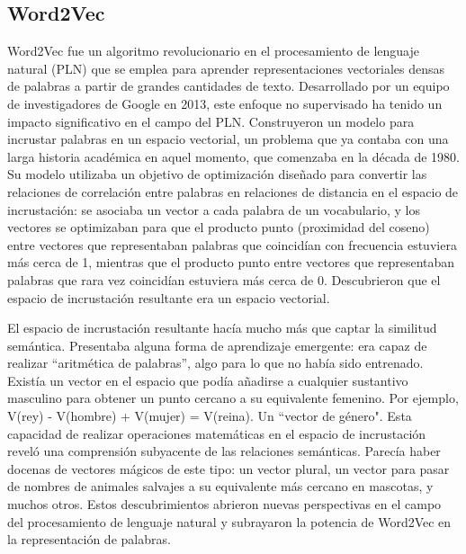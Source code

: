\subsection{Word2Vec}

Word2Vec fue un algoritmo revolucionario en el procesamiento de lenguaje natural (PLN) que se emplea para aprender representaciones vectoriales densas de palabras a partir de grandes cantidades de texto. Desarrollado por un equipo de investigadores de Google en 2013\cite{Mikolov2013Word2Vec}, este enfoque no supervisado ha tenido un impacto significativo en el campo del PLN. Construyeron un modelo para incrustar palabras en un espacio vectorial, un problema que ya contaba con una larga historia académica en aquel momento, que comenzaba en la década de 1980. Su modelo utilizaba un objetivo de optimización diseñado para convertir las relaciones de correlación entre palabras en relaciones de distancia en el espacio de incrustación: se asociaba un vector a cada palabra de un vocabulario, y los vectores se optimizaban para que el producto punto (proximidad del coseno) entre vectores que representaban palabras que coincidían con frecuencia estuviera más cerca de 1, mientras que el producto punto entre vectores que representaban palabras que rara vez coincidían estuviera más cerca de 0. Descubrieron que el espacio de incrustación resultante era un espacio vectorial. 

El espacio de incrustación resultante hacía mucho más que captar la similitud semántica. Presentaba alguna forma de aprendizaje emergente: era capaz de realizar ``aritmética de palabras'', algo para lo que no había sido entrenado. Existía un vector en el espacio que podía añadirse a cualquier sustantivo masculino para obtener un punto cercano a su equivalente femenino. Por ejemplo, V(rey) - V(hombre) + V(mujer) = V(reina). Un ``vector de género". Esta capacidad de realizar operaciones matemáticas en el espacio de incrustación reveló una comprensión subyacente de las relaciones semánticas. Parecía haber docenas de vectores mágicos de este tipo: un vector plural, un vector para pasar de nombres de animales salvajes a su equivalente más cercano en mascotas, y muchos otros. Estos descubrimientos abrieron nuevas perspectivas en el campo del procesamiento de lenguaje natural y subrayaron la potencia de Word2Vec en la representación de palabras\cite{Chollet}.


